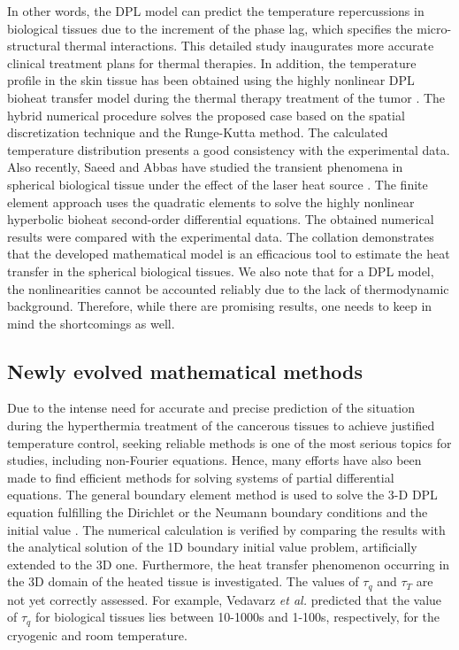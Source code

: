 \documentclass[sn-mathphys]{sn-jnl}%
\theoremstyle{thmstyleone}%
\theoremstyle{thmstyletwo}%
\theoremstyle{thmstylethree}%
\begin{document}
{In other words, the DPL model can predict the temperature repercussions in biological tissues due to the increment of the phase lag, which specifies the micro-structural thermal interactions. This detailed study inaugurates more accurate clinical treatment plans for thermal therapies. In addition, the temperature profile in the skin tissue has been obtained using the highly nonlinear DPL bioheat transfer model during the thermal therapy treatment of the tumor \cite{Kumar2018}. The hybrid numerical procedure solves the proposed case based on the spatial discretization technique and the Runge-Kutta method. The calculated temperature distribution presents a good consistency with the experimental data. Also recently, Saeed and Abbas have studied the transient phenomena in spherical biological tissue under the effect of the laser heat source \cite{TSaeed2020}. The finite element approach uses the quadratic elements to solve the highly nonlinear hyperbolic bioheat second-order differential equations. The obtained numerical results were compared with the experimental data. The collation demonstrates that the developed mathematical model is an efficacious tool to estimate the heat transfer in the spherical biological tissues. { We also note that for a DPL model, the nonlinearities cannot be accounted reliably due to the lack of thermodynamic background. Therefore, while there are promising results, one needs to keep in mind the shortcomings as well.}

\subsection{Newly evolved mathematical methods}
Due to the intense need for accurate and precise prediction of the situation during the hyperthermia treatment of the cancerous tissues to achieve justified temperature control, seeking reliable methods is one of the most serious topics for studies, including non-Fourier equations. Hence, many efforts have also been made to find efficient methods for solving systems of partial differential equations. The general boundary element method is used to solve the 3-D DPL equation fulfilling the Dirichlet or the Neumann boundary conditions and the initial value \cite{Majchrzak2015}. The numerical calculation is verified by comparing the results with the analytical solution of the 1D boundary initial value problem, artificially extended to the 3D one. Furthermore, the heat transfer phenomenon occurring in the 3D domain of the heated tissue is investigated. The values of $\tau_q$ and $\tau_T$ are not yet correctly assessed. For example, Vedavarz \emph{et al.} \cite{Vedavarz1994} predicted that the value of $\tau_q$ for biological tissues lies between 10-1000s and 1-100s, respectively, for the cryogenic and room temperature. 

}
\end{document}
